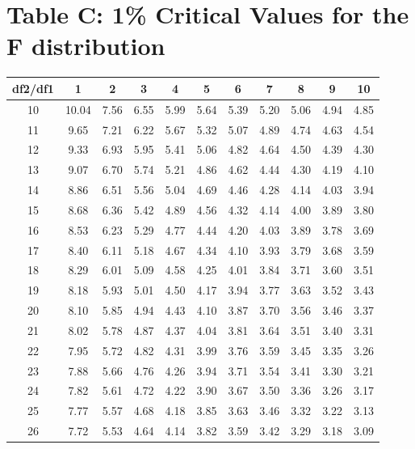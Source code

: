 \documentclass[
]{book}
\theoremstyle{definition}
\theoremstyle{definition}
\theoremstyle{definition}
\theoremstyle{definition}
\theoremstyle{remark}
\begin{document}
\hypertarget{table-c-1-critical-values-for-the-f-distribution}{%
\section*{Table C: 1\% Critical Values for the F distribution}\label{table-c-1-critical-values-for-the-f-distribution}}

\begin{longtable}[]{@{}ccccccccccc@{}}
\toprule()
df2/df1 & 1 & 2 & 3 & 4 & 5 & 6 & 7 & 8 & 9 & 10 \\
\midrule()
\endhead
10 & 10.04 & 7.56 & 6.55 & 5.99 & 5.64 & 5.39 & 5.20 & 5.06 & 4.94 & 4.85 \\
11 & 9.65 & 7.21 & 6.22 & 5.67 & 5.32 & 5.07 & 4.89 & 4.74 & 4.63 & 4.54 \\
12 & 9.33 & 6.93 & 5.95 & 5.41 & 5.06 & 4.82 & 4.64 & 4.50 & 4.39 & 4.30 \\
13 & 9.07 & 6.70 & 5.74 & 5.21 & 4.86 & 4.62 & 4.44 & 4.30 & 4.19 & 4.10 \\
14 & 8.86 & 6.51 & 5.56 & 5.04 & 4.69 & 4.46 & 4.28 & 4.14 & 4.03 & 3.94 \\
15 & 8.68 & 6.36 & 5.42 & 4.89 & 4.56 & 4.32 & 4.14 & 4.00 & 3.89 & 3.80 \\
16 & 8.53 & 6.23 & 5.29 & 4.77 & 4.44 & 4.20 & 4.03 & 3.89 & 3.78 & 3.69 \\
17 & 8.40 & 6.11 & 5.18 & 4.67 & 4.34 & 4.10 & 3.93 & 3.79 & 3.68 & 3.59 \\
18 & 8.29 & 6.01 & 5.09 & 4.58 & 4.25 & 4.01 & 3.84 & 3.71 & 3.60 & 3.51 \\
19 & 8.18 & 5.93 & 5.01 & 4.50 & 4.17 & 3.94 & 3.77 & 3.63 & 3.52 & 3.43 \\
20 & 8.10 & 5.85 & 4.94 & 4.43 & 4.10 & 3.87 & 3.70 & 3.56 & 3.46 & 3.37 \\
21 & 8.02 & 5.78 & 4.87 & 4.37 & 4.04 & 3.81 & 3.64 & 3.51 & 3.40 & 3.31 \\
22 & 7.95 & 5.72 & 4.82 & 4.31 & 3.99 & 3.76 & 3.59 & 3.45 & 3.35 & 3.26 \\
23 & 7.88 & 5.66 & 4.76 & 4.26 & 3.94 & 3.71 & 3.54 & 3.41 & 3.30 & 3.21 \\
24 & 7.82 & 5.61 & 4.72 & 4.22 & 3.90 & 3.67 & 3.50 & 3.36 & 3.26 & 3.17 \\
25 & 7.77 & 5.57 & 4.68 & 4.18 & 3.85 & 3.63 & 3.46 & 3.32 & 3.22 & 3.13 \\
26 & 7.72 & 5.53 & 4.64 & 4.14 & 3.82 & 3.59 & 3.42 & 3.29 & 3.18 & 3.09 \\

\end{longtable}
\end{document}
